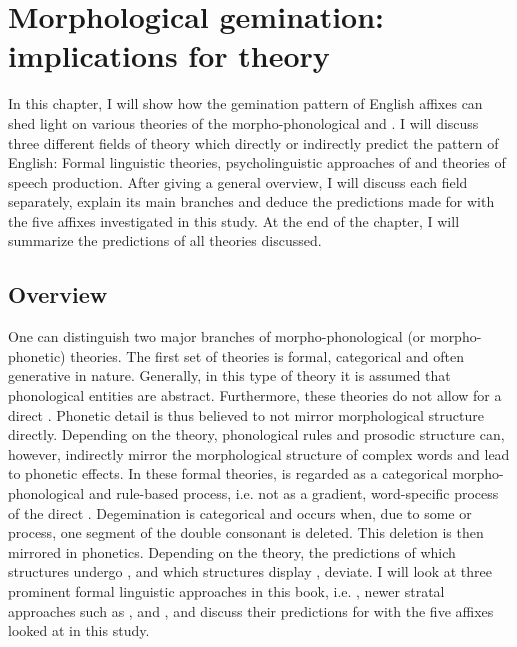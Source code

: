 \chapter {Morphological gemination: implications for theory} \label{Theory}

In this chapter, I will show how the {gemination} pattern of English affixes can shed light on various theories of the morpho-phonological and . I will discuss three different fields of theory which directly or indirectly predict the  pattern of English: Formal linguistic theories, psycholinguistic approaches of  and theories of speech production. After giving a general overview, I will discuss each field  separately, explain its main branches and deduce the predictions made for  with the five affixes investigated in this study.  At the end of the chapter, I will summarize the predictions of all theories discussed.\\


\section{Overview}
One can distinguish two major branches of morpho-phonological (or morpho-phonetic) theories. The first set of theories is formal, categorical and often generative in nature. Generally, in this type of theory it is assumed that phonological entities are abstract. Furthermore, these theories do not allow for a direct . Phonetic detail is thus believed to not mirror morphological structure directly. Depending on the theory, phonological rules and prosodic structure can, however, indirectly mirror the morphological structure of complex words and lead to phonetic effects. 
In these formal theories,  is regarded as a categorical morpho-phonological and rule-based process, i.e. not as a gradient, word-specific process of the direct . Degemination is categorical and occurs when, due to some  or process, one segment of the double consonant is deleted. This deletion is then mirrored in phonetics. Depending on the theory, the predictions of which structures undergo , and which structures display , deviate. I will look at three prominent formal linguistic approaches in this book, i.e. , newer stratal approaches such as , and ,  and discuss their predictions for  with the five affixes looked at in this study. 

